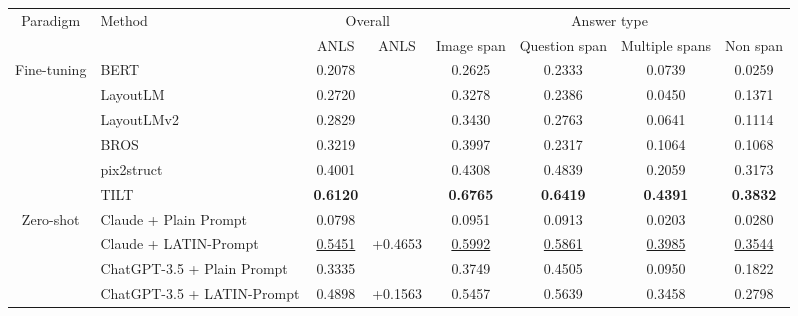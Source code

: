 \documentclass[letterpaper]{article} \usepackage{aaai24_preprint}  \usepackage{times}  \usepackage{helvet}  \usepackage{courier}  \usepackage[hyphens]{url}  \usepackage{graphicx} \urlstyle{rm} \def\UrlFont{\rm}  \usepackage{natbib}  \usepackage{caption} \frenchspacing  \setlength{\pdfpagewidth}{8.5in} \setlength{\pdfpageheight}{11in} \usepackage{algorithm}
\begin{document}
\begin{table*}[t]
\small
\centering
\begin{tabular}{@{}cl|cc|cccc@{}}
\toprule
\multirow{2}{*}{Paradigm}    & \multirow{2}{*}{Method} & \multicolumn{2}{c|}{Overall}   & \multicolumn{4}{c}{Answer type}                                       \\
                             &                         & ANLS            & ANLS & Image span      & Question span   & Multiple spans  & Non span        \\ \midrule
\multirow{6}{*}{Fine-tuning} & BERT                    & 0.2078          &              & 0.2625          & 0.2333          & 0.0739          & 0.0259          \\
                             & LayoutLM          & 0.2720          &              & 0.3278          & 0.2386          & 0.0450          & 0.1371          \\
                             & LayoutLMv2              & 0.2829          &              & 0.3430          & 0.2763          & 0.0641          & 0.1114          \\
                             & BROS                    & 0.3219          &              & 0.3997          & 0.2317          & 0.1064          & 0.1068          \\
                             & pix2struct              & 0.4001          &              & 0.4308          & 0.4839          & 0.2059          & 0.3173          \\
                             & TILT                    & \textbf{0.6120} &     & \textbf{0.6765} & \textbf{0.6419} & \textbf{0.4391} & \textbf{0.3832} \\ \midrule
\multirow{4}{*}{Zero-shot}   & Claude + Plain Prompt    & 0.0798          &              & 0.0951          & 0.0913          & 0.0203          & 0.0280          \\
                             & Claude + LATIN-Prompt   & \underline{0.5451}    & +0.4653      & \underline{0.5992}    & \underline{0.5861}    &\underline{0.3985}   &\underline{0.3544}    \\ \cmidrule(l){2-8} 
                             & ChatGPT-3.5 + Plain Prompt   & 0.3335          &              & 0.3749          & 0.4505          & 0.0950          & 0.1822          \\
                             & ChatGPT-3.5 + LATIN-Prompt  & 0.4898          & +0.1563      & 0.5457          & 0.5639          & 0.3458          & 0.2798          \\ \bottomrule
\end{tabular}


\end{table*}
\end{document}
